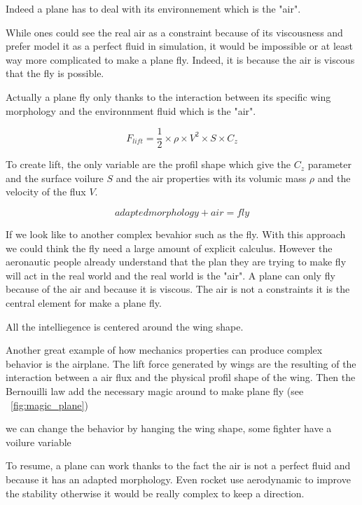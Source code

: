 Indeed a plane has to deal with its environnement which is the "air".

While ones could see the real air as a constraint because of its viscousness and prefer model it as a perfect fluid in simulation, it would be impossible or at least way more complicated to make a plane fly. Indeed, it is because the air is viscous that the fly is possible.

Actually a plane fly only thanks to the interaction between its specific wing morphology and the environnment fluid which is the "air".

\begin{equation}
    F_{lift} = \frac12 \times \rho \times V^2\times S \times C_z
\end{equation}

To create lift, the only variable are the profil shape which give the $C_z$ parameter and the surface voilure $S$ and the air properties with its volumic mass $\rho$ and the velocity of the flux $V$.

\begin{equation}
    adapted morphology + air = fly
\end{equation}

If we look like to another complex bevahior such as the fly. With this approach we could think the fly need a large amount of explicit calculus. However the aeronautic people already understand that the plan they are trying to make fly will act in the real world and the real world is the "air". A plane can only fly because of the air and because it is viscous. The air is not a constraints it is the central element for make a plane fly.

All the intelliegence is centered around the wing shape.


Another great example of how mechanics properties can produce complex behavior is the airplane.
The lift force generated by wings are the resulting of the interaction between a air flux and the physical profil shape of the wing.
Then the Bernouilli law add the necessary magic around to make plane fly (see \figurename~\ref{fig:magic_plane})

we can change the behavior by hanging the wing shape, some fighter have a voilure variable

To resume, a plane can work thanks to the fact the air is not a perfect fluid and because it has an adapted morphology. Even rocket use aerodynamic to improve the stability otherwise it would be really complex to keep a direction.



